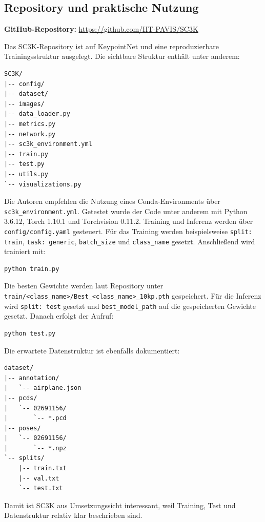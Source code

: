 \documentclass[11pt,a4paper]{article}
\begin{document}
\subsection{Repository und praktische Nutzung}

\textbf{GitHub-Repository:} \url{https://github.com/IIT-PAVIS/SC3K}

Das SC3K-Repository ist auf KeypointNet und eine reproduzierbare Trainingsstruktur ausgelegt. Die sichtbare Struktur enthält unter anderem:

\begin{lstlisting}
SC3K/
|-- config/
|-- dataset/
|-- images/
|-- data_loader.py
|-- metrics.py
|-- network.py
|-- sc3k_environment.yml
|-- train.py
|-- test.py
|-- utils.py
`-- visualizations.py
\end{lstlisting}

Die Autoren empfehlen die Nutzung eines Conda-Environments über \texttt{sc3k\_environment.yml}. Getestet wurde der Code unter anderem mit Python 3.6.12, Torch 1.10.1 und Torchvision 0.11.2. Training und Inferenz werden über \texttt{config/config.yaml} gesteuert. Für das Training werden beispielsweise \texttt{split: train}, \texttt{task: generic}, \texttt{batch\_size} und \texttt{class\_name} gesetzt. Anschließend wird trainiert mit:

\begin{lstlisting}
python train.py
\end{lstlisting}

Die besten Gewichte werden laut Repository unter \texttt{train/<class\_name>/Best\_<class\_name>\_10kp.pth} gespeichert. Für die Inferenz wird \texttt{split: test} gesetzt und \texttt{best\_model\_path} auf die gespeicherten Gewichte gesetzt. Danach erfolgt der Aufruf:

\begin{lstlisting}
python test.py
\end{lstlisting}

Die erwartete Datenstruktur ist ebenfalls dokumentiert:

\begin{lstlisting}
dataset/
|-- annotation/
|   `-- airplane.json
|-- pcds/
|   `-- 02691156/
|       `-- *.pcd
|-- poses/
|   `-- 02691156/
|       `-- *.npz
`-- splits/
    |-- train.txt
    |-- val.txt
    `-- test.txt
\end{lstlisting}

Damit ist SC3K aus Umsetzungssicht interessant, weil Training, Test und Datenstruktur relativ klar beschrieben sind.
\end{document}
